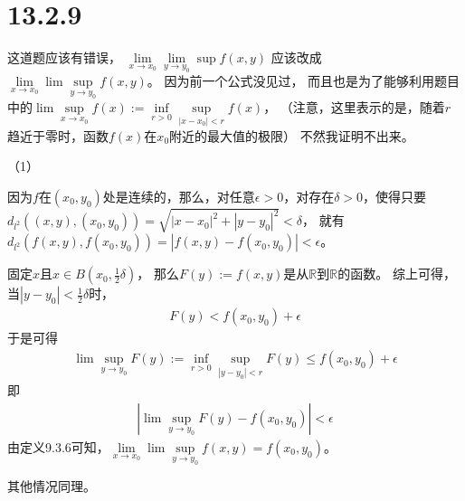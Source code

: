 \documentclass{article}
\begin{document}
\section*{13.2.9}

\begin{zremark}
  这道题应该有错误，
  $\lim\limits_{x \to x_0}\lim\limits_{y \to y_0}\sup f(x, y)$
  应该改成
  $\lim \limits_{x \to x_0}\lim \sup \limits_{y \to y_0}f(x, y)$。
  因为前一个公式没见过，
  而且也是为了能够利用题目中的$\lim \sup \limits_{x \to x_0}f(x) := \inf \limits_{r > 0} \sup \limits_{|x - x_0| < r} f(x)$，
  （注意，这里表示的是，随着$r$趋近于零时，函数$f(x)$在$x_0$附近的最大值的极限）
  不然我证明不出来。
\end{zremark}

（1）

因为$f$在$(x_0, y_0)$处是连续的，那么，对任意$\epsilon > 0$，对存在$\delta > 0$，使得只要
$d_{l^2}((x, y), (x_0, y_0)) = \sqrt{|x - x_0|^2 + |y - y_0|^2} < \delta$，
就有$d_{l^2}(f(x, y), f(x_0, y_0)) = |f(x, y) - f(x_0, y_0)| < \epsilon$。

固定$x$且$x \in B(x_0, \frac{1}{2}\delta)$，
那么$F(y) := f(x, y)$是从$\mathbb{R}$到$\mathbb{R}$的函数。
综上可得，当$|y - y_0| < \frac{1}{2}\delta$时，
\begin{align*}
  F(y) < f(x_0, y_0) + \epsilon
\end{align*}
于是可得
\begin{align*}
  \lim \sup \limits_{y \to y_0}F(y) := \inf \limits_{r > 0} \sup \limits_{|y - y_0| < r} F(y) \leq f(x_0, y_0) + \epsilon
\end{align*}
即
\begin{align*}
  |\lim \sup \limits_{y \to y_0}F(y) - f(x_0, y_0)| < \epsilon
\end{align*}
由定义9.3.6可知，$\lim \limits_{x \to x_0}\lim \sup \limits_{y \to y_0}f(x, y) = f(x_0, y_0)$。

其他情况同理。


\end{document}

